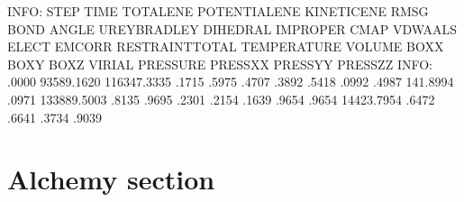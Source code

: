 \documentclass[a4paper,11pt,oneside,english]{sphinxmanual}
\begin{document}
\begin{sphinxVerbatim}[commandchars=\\\{\}]
INFO:      STEP           TIME      TOTAL\PYGZus{}ENE  POTENTIAL\PYGZus{}ENE     KINETIC\PYGZus{}ENE
           RMSG           BOND          ANGLE   UREY\PYGZhy{}BRADLEY        DIHEDRAL
       IMPROPER           CMAP        VDWAALS          ELECT          EMCORR
RESTRAINT\PYGZus{}TOTAL    TEMPERATURE         VOLUME           BOXX            BOXY
           BOXZ         VIRIAL       PRESSURE        PRESSXX         PRESSYY
        PRESSZZ
\PYGZhy{}\PYGZhy{}\PYGZhy{}\PYGZhy{}\PYGZhy{}\PYGZhy{}\PYGZhy{}\PYGZhy{}\PYGZhy{}\PYGZhy{}\PYGZhy{}\PYGZhy{}\PYGZhy{}\PYGZhy{}\PYGZhy{} \PYGZhy{}\PYGZhy{}\PYGZhy{}\PYGZhy{}\PYGZhy{}\PYGZhy{}\PYGZhy{}\PYGZhy{}\PYGZhy{}\PYGZhy{}\PYGZhy{}\PYGZhy{}\PYGZhy{}\PYGZhy{} \PYGZhy{}\PYGZhy{}\PYGZhy{}\PYGZhy{}\PYGZhy{}\PYGZhy{}\PYGZhy{}\PYGZhy{}\PYGZhy{}\PYGZhy{}\PYGZhy{}\PYGZhy{}\PYGZhy{}\PYGZhy{} \PYGZhy{}\PYGZhy{}\PYGZhy{}\PYGZhy{}\PYGZhy{}\PYGZhy{}\PYGZhy{}\PYGZhy{}\PYGZhy{}\PYGZhy{}\PYGZhy{}\PYGZhy{}\PYGZhy{}\PYGZhy{} \PYGZhy{}\PYGZhy{}\PYGZhy{}\PYGZhy{}\PYGZhy{}\PYGZhy{}\PYGZhy{}\PYGZhy{}\PYGZhy{}\PYGZhy{}\PYGZhy{}\PYGZhy{}\PYGZhy{}\PYGZhy{}\PYGZhy{}
INFO:                .0000    \PYGZhy{}93589.1620   \PYGZhy{}116347.3335      .1715
         .5975       .4707      .3892       .5418       .0992
       .4987      \PYGZhy{}141.8994     .0971   \PYGZhy{}133889.5003          .8135
       .9695       .2301    .2154        .1639         .9654
        .9654    \PYGZhy{}14423.7954       .6472       .6641         .3734
        .9039
\end{sphinxVerbatim}


\chapter{Alchemy section}
\label{\detokenize{20_Alchemy:alchemy-section}}\label{\detokenize{20_Alchemy:alchemy}}\label{\detokenize{20_Alchemy::doc}}
\end{document}
